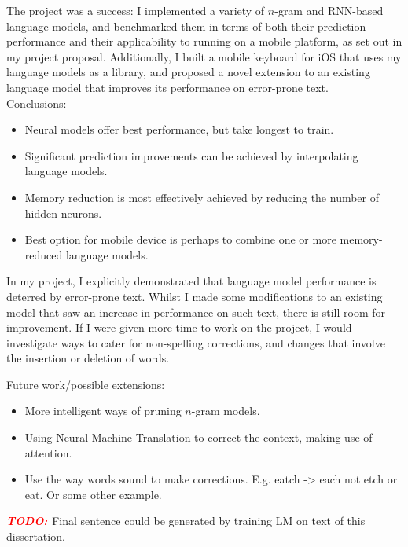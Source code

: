 \documentclass[a4paper, 12pt]{report}
\newcommand{\todo}{\textbf{\textit{\textcolor{red}{TODO: }}}}
\begin{document}
The project was a success: I implemented a variety of $n$-gram and RNN-based language models, and benchmarked them in terms of both their prediction performance and their applicability to running on a mobile platform, as set out in my project proposal. Additionally, I built a mobile keyboard for iOS that uses my language models as a library, and proposed a novel extension to an existing language model that improves its performance on error-prone text. \\

Conclusions:
\begin{itemize}
\item
	Neural models offer best performance, but take longest to train.
\item
	Significant prediction improvements can be achieved by interpolating language models.
\item
	Memory reduction is most effectively achieved by reducing the number of hidden neurons.
\item
	Best option for mobile device is perhaps to combine one or more memory-reduced language models.
\end{itemize}

In my project, I explicitly demonstrated that language model performance is deterred by error-prone text. Whilst I made some modifications to an existing model that saw an increase in performance on such text, there is still room for improvement. If I were given more time to work on the project, I would investigate ways to cater for non-spelling corrections, and changes that involve the insertion or deletion of words.

Future work/possible extensions:
\begin{itemize}
\item
	More intelligent ways of pruning $n$-gram models.
\item
	Using Neural Machine Translation to correct the context, making use of attention.
\item
	Use the way words sound to make corrections. E.g. eatch -> each not etch or eat. Or some other example.
\end{itemize}

\todo{Final sentence could be generated by training LM on text of this dissertation.}



\end{document}
